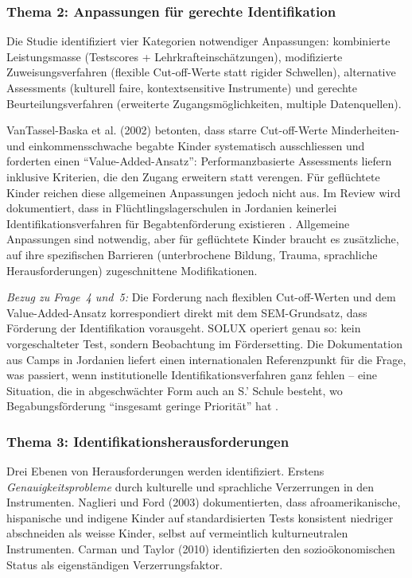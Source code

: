 \documentclass[ngerman, a4paper]{article}
\begin{document}
\subsubsection*{Thema 2: Anpassungen für gerechte Identifikation}

Die Studie identifiziert vier Kategorien notwendiger Anpassungen:
kombinierte Leistungsmasse (Testscores + Lehrkrafteinschätzungen),
modifizierte Zuweisungsverfahren (flexible Cut-off-Werte statt rigider
Schwellen), alternative Assessments (kulturell faire, kontextsensitive
Instrumente) und gerechte Beurteilungsverfahren (erweiterte
Zugangsmöglichkeiten, multiple Datenquellen).

VanTassel-Baska et al. (2002) betonten, dass starre Cut-off-Werte
Minderheiten- und einkommensschwache begabte Kinder systematisch
ausschliessen und forderten einen \enquote{Value-Added-Ansatz}:
Performanzbasierte Assessments liefern inklusive Kriterien, die den Zugang
erweitern statt verengen. Für geflüchtete Kinder reichen diese allgemeinen
Anpassungen jedoch nicht aus. Im Review wird dokumentiert, dass in
Flüchtlingslagerschulen in Jordanien keinerlei Identifikationsverfahren
für Begabtenförderung existieren \parencite[S.\,12]{alodat2025equitable}.
Allgemeine Anpassungen sind notwendig, aber für geflüchtete Kinder braucht
es zusätzliche, auf ihre spezifischen Barrieren (unterbrochene Bildung,
Trauma, sprachliche Herausforderungen) zugeschnittene Modifikationen.

\textit{Bezug zu Frage~4 und~5:} Die Forderung nach flexiblen
Cut-off-Werten und dem Value-Added-Ansatz korrespondiert direkt mit dem
SEM-Grundsatz, dass Förderung der Identifikation vorausgeht. SOLUX
operiert genau so: kein vorgeschalteter Test, sondern Beobachtung im
Fördersetting. Die Dokumentation aus Camps in Jordanien liefert einen
internationalen Referenzpunkt für die Frage, was passiert, wenn
institutionelle Identifikationsverfahren ganz fehlen -- eine Situation, die
in abgeschwächter Form auch an S.' Schule besteht, wo Begabungsförderung
\enquote{insgesamt geringe Priorität} hat
\parencite{dvs2025bbf}.

\subsubsection*{Thema 3: Identifikationsherausforderungen}

Drei Ebenen von Herausforderungen werden identifiziert. Erstens
\textit{Genauigkeitsprobleme} durch kulturelle und sprachliche
Verzerrungen in den Instrumenten. Naglieri und Ford (2003) dokumentierten,
dass afroamerikanische, hispanische und indigene Kinder auf
standardisierten Tests konsistent niedriger abschneiden als weisse Kinder,
selbst auf vermeintlich kulturneutralen Instrumenten. Carman und Taylor
(2010) identifizierten den sozioökonomischen Status als eigenständigen
Verzerrungsfaktor.
\end{document}
